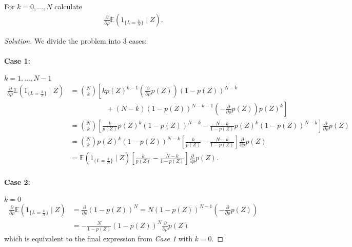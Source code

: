 \documentclass[10pt]{article}
\newcommand{\E}{\mathbb{E}}
\newenvironment{problem}[2][Problem]{\begin{trivlist}
\item[\hskip \labelsep {\bfseries #1}\hskip \labelsep {\bfseries #2.}]}{\end{trivlist}}
\begin{document}
\begin{problem}{6}
    For $k = 0, \ldots, N$ calculate
    \begin{align} \tag{3} \label{eqn:partial_expectation}
        \frac{\partial}{\partial \rho} \E \left( 1_{\{L = \frac{k}{N}\}} \mid Z \right).
    \end{align}
\end{problem}

\begin{proof}[Solution]
    We divide the problem into 3 cases:

    \paragraph{Case 1:} $k = 1, \ldots, N-1$
    \begin{align*}
        \frac{\partial}{\partial \rho} \E \left( 1_{\{L = \frac{k}{N}\}} \mid Z \right) &= \binom{N}{k} \left[ k p(Z)^{k-1} \left( \frac{\partial}{\partial \rho} p(Z) \right) (1 - p(Z))^{N-k} \right. \\
        & \qquad \qquad \quad + \left. (N-k) (1 - p(Z))^{N-k-1} \left( -\frac{\partial}{\partial \rho} p(Z) \right) p(Z)^k \right] \\
        &= \binom{N}{k} \left[ \frac{k}{p(Z)} p(Z)^k (1 - p(Z))^{N-k} - \frac{N-k}{1 - p(Z)} p(Z)^k (1 - p(Z))^{N-k} \right] \frac{\partial}{\partial \rho} p(Z) \\
        &= \binom{N}{k} p(Z)^k (1 - p(Z))^{N-k} \left[ \frac{k}{p(Z)} - \frac{N-k}{1 - p(Z)} \right] \frac{\partial}{\partial \rho} p(Z) \\
        &= \E \left( 1_{\{L = \frac{k}{N}\}} \mid Z \right) \left[ \frac{k}{p(Z)} - \frac{N-k}{1 - p(Z)} \right] \frac{\partial}{\partial \rho} p(Z).
    \end{align*}

    \paragraph{Case 2:} $k = 0$
    \begin{align*}
        \frac{\partial}{\partial \rho} \E \left( 1_{\{L = \frac{k}{N}\}} \mid Z \right) &= \frac{\partial}{\partial \rho} (1 - p(Z))^N = N (1 - p(Z))^{N-1} \left( -\frac{\partial}{\partial \rho} p(Z) \right) \\
        &= -\frac{N}{1 - p(Z)} (1 - p(Z))^N \frac{\partial}{\partial \rho} p(Z)
    \end{align*}
    which is equivalent to the final expression from \textit{Case 1} with $k = 0$.


\end{proof}
\end{document}
